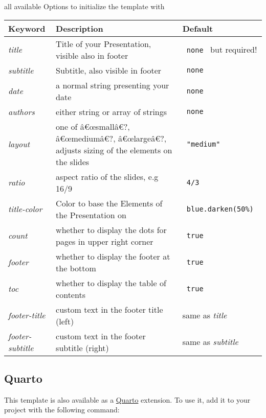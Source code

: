 all available Options to initialize the template with

\begin{longtable}[]{@{}lll@{}}
\toprule\noalign{}
Keyword & Description & Default \\
\midrule\noalign{}
\endhead
\bottomrule\noalign{}
\endlastfoot
\emph{title} & Title of your Presentation, visible also in footer &
\texttt{\ none\ } but required! \\
\emph{subtitle} & Subtitle, also visible in footer &
\texttt{\ none\ } \\
\emph{date} & a normal string presenting your date &
\texttt{\ none\ } \\
\emph{authors} & either string or array of strings &
\texttt{\ none\ } \\
\emph{layout} & one of â€œsmallâ€?, â€œmediumâ€?, â€œlargeâ€?, adjusts
sizing of the elements on the slides & \texttt{\ "medium"\ } \\
\emph{ratio} & aspect ratio of the slides, e.g 16/9 &
\texttt{\ 4/3\ } \\
\emph{title-color} & Color to base the Elements of the Presentation on &
\texttt{\ blue.darken(50\%)\ } \\
\emph{count} & whether to display the dots for pages in upper right
corner & \texttt{\ true\ } \\
\emph{footer} & whether to display the footer at the bottom &
\texttt{\ true\ } \\
\emph{toc} & whether to display the table of contents &
\texttt{\ true\ } \\
\emph{footer-title} & custom text in the footer title (left) & same as
\emph{title} \\
\emph{footer-subtitle} & custom text in the footer subtitle (right) &
same as \emph{subtitle} \\
\end{longtable}

\subsection{Quarto}\label{quarto}

This template is also available as a \href{https://quarto.org/}{Quarto}
extension. To use it, add it to your project with the following command:

\begin{Shaded}
\begin{Highlighting}[]
\end{Highlighting}
\end{Shaded}

